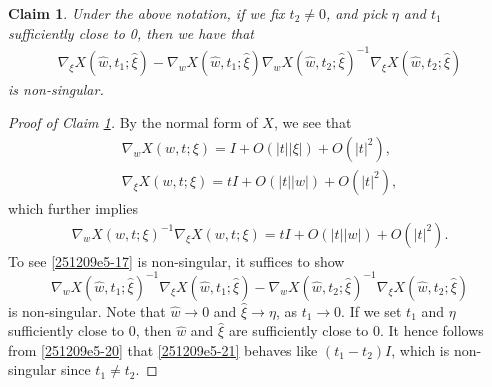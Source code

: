 \documentclass{article}
\numberwithin{equation}{section}
\theoremstyle{plain}
\newtheorem{claim}[theorem]{Claim}
\begin{document}
\begin{claim}\label{260309claim5_1}
    Under the above notation, if we fix $t_2\neq 0$, and pick $\eta$ and $t_1$ sufficiently close to 0, then we have that
    \begin{align}\label{251209e5-17}
        \nabla_\xi X(\hat{w},t_1;\hat{\xi})- \nabla_w X(\hat{w},t_1;\hat{\xi}) \nabla_w X(\hat{w},t_2;\hat{\xi})^{-1} \nabla_\xi X(\hat{w},t_2;\hat{\xi})
    \end{align}
    is non-singular.
\end{claim}

\begin{proof}[Proof of Claim \ref{260309claim5_1}]
    By the normal form of $X$, we see that
    \begin{align}
        \nabla_w X(w,t;\xi)= I+O(|t||\xi|)+O(|t|^2),\ \\
        \nabla_\xi X(w,t;\xi)= tI+ O(|t||w|)+O(|t|^2),
    \end{align}
    which further implies 
    \begin{align}\label{251209e5-20}
        \nabla_w X(w,t;\xi)^{-1}\nabla_\xi X(w,t;\xi)= tI+O(|t||w|)+O(|t|^2).
    \end{align}
    To see \eqref{251209e5-17} is non-singular, it suffices to show
    \begin{equation}\label{251209e5-21}
        \nabla_w X(\hat{w},t_1;\hat{\xi})^{-1}\nabla_\xi X(\hat{w},t_1;\hat{\xi})-  \nabla_w X(\hat{w},t_2;\hat{\xi})^{-1} \nabla_\xi X(\hat{w},t_2;\hat{\xi})
    \end{equation}
    is non-singular. Note that $\hat{w}\to 0$ and $\hat{\xi}\to \eta$, as $t_1\to 0$. If we set $t_1$ and $\eta$ sufficiently close to 0, then  $\hat{w}$ and $\hat{\xi}$ are sufficiently close to 0. It hence follows from \eqref{251209e5-20} that \eqref{251209e5-21} behaves like $(t_1-t_2)I$, which is non-singular since $t_1\neq t_2$.    
    
\end{proof}
\end{document}
